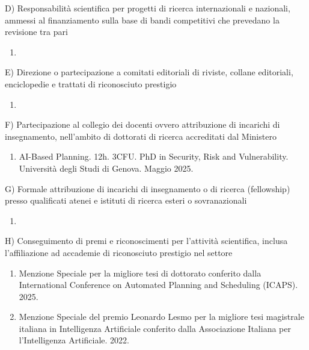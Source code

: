 \documentclass{resume} %
\begin{document}
\begin{rSectionLower}{D) Responsabilità scientifica per progetti di ricerca internazionali e nazionali, ammessi al finanziamento sulla base di bandi competitivi che prevedano la revisione tra pari}
	\begin{enumerate}
		\item 
	\end{enumerate}
\end{rSectionLower}

\begin{rSectionLower}{E) Direzione o partecipazione a comitati editoriali di riviste, collane editoriali, enciclopedie e trattati di riconosciuto prestigio}
	\begin{enumerate}
		\item 
	\end{enumerate}
\end{rSectionLower}

\begin{rSectionLower}{F) Partecipazione al collegio dei docenti ovvero attribuzione di incarichi di insegnamento, nell'ambito di dottorati di ricerca accreditati dal Ministero}
	\begin{enumerate}
		\item AI-Based Planning. 12h. 3CFU. PhD in Security, Risk and Vulnerability. Università degli Studi di Genova. Maggio 2025.
	\end{enumerate}
\end{rSectionLower}

\begin{rSectionLower}{G) Formale attribuzione di incarichi di insegnamento o di ricerca (fellowship) presso qualificati atenei e istituti di ricerca esteri o sovranazionali}
	\begin{enumerate}
		\item 
	\end{enumerate}
\end{rSectionLower}

\begin{rSectionLower}{H) Conseguimento di premi e riconoscimenti per l'attività scientifica, inclusa l’affiliazione ad accademie di riconosciuto prestigio nel settore}
	\begin{enumerate}
		\item Menzione Speciale per la migliore tesi di dottorato conferito dalla International Conference on Automated Planning and Scheduling (ICAPS). 2025.
		\item Menzione Speciale del premio Leonardo Lesmo per la migliore tesi magistrale italiana in Intelligenza Artificiale conferito dalla Associazione Italiana per l'Intelligenza Artificiale. 2022.
	\end{enumerate}
\end{rSectionLower}
\end{document}
